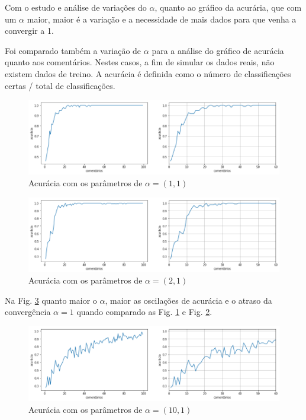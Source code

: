 Com o estudo e análise de variações do $\alpha$, quanto ao gráfico da acurária, que com um $\alpha$ maior, maior é a variação e a necessidade de mais dados para que venha a convergir a 1. 

Foi comparado também a variação de $\alpha$ para a análise do gráfico de acurácia quanto aos comentários. Nestes casos, a fim de simular os dados reais, não existem dados de treino. A acurácia é definida como o número de classificações certas / total de classificações.

\begin{figure}[!h]
	\centering
	\includegraphics[keepaspectratio=true,scale=0.480]{figuras/compare-diri-1.png}
	\caption{Acurácia com os parâmetros de $\alpha = (1, 1)$}
	\label{compare:diri-1}
\end{figure}

\begin{figure}[!h]
	\centering
	\includegraphics[keepaspectratio=true,scale=0.480]{figuras/compare-diri-2.png}
	\caption{Acurácia com os parâmetros de $\alpha = (2, 1)$}
	\label{compare:diri-2}
\end{figure}

Na Fig. \ref{compare:diri-10} quanto maior o $\alpha$, maior as oscilações de acurácia e o atraso da convergência $\alpha = 1$ quando comparado as Fig. \ref{compare:diri-1} e Fig. \ref{compare:diri-2}.

\begin{figure}[!h]
	\centering
	\includegraphics[keepaspectratio=true,scale=0.480]{figuras/compare-diri-3.png}
	\caption{Acurácia com os parâmetros de $\alpha = (10, 1)$}
	\label{compare:diri-10}
\end{figure}


